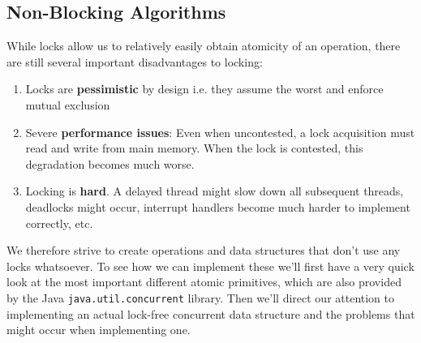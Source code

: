 \documentclass[main]{subfiles}
\begin{document}
\subsection{Non-Blocking Algorithms}
While locks allow us to relatively easily obtain atomicity of an operation, there are still several important disadvantages to locking:
\begin{enumerate}
    \item Locks are \textbf{pessimistic} by design i.e. they assume the worst and enforce mutual exclusion
    \item Severe \textbf{performance issues}: Even when uncontested, a lock acquisition must read and write from main memory. When the lock is contested, this degradation becomes much worse.
    \item Locking is \textbf{hard}. A delayed thread might slow down all subsequent threads, deadlocks might occur, interrupt handlers become much harder to implement correctly, etc.
\end{enumerate}
We therefore strive to create operations and data structures that don't use any locks whatsoever. To see how we can implement these we'll first have a very quick look at the most important different atomic primitives, which are also provided by the Java \texttt{java.util.concurrent} library. Then we'll direct our attention to implementing an actual lock-free concurrent data structure and the problems that might occur when implementing one.
\end{document}
